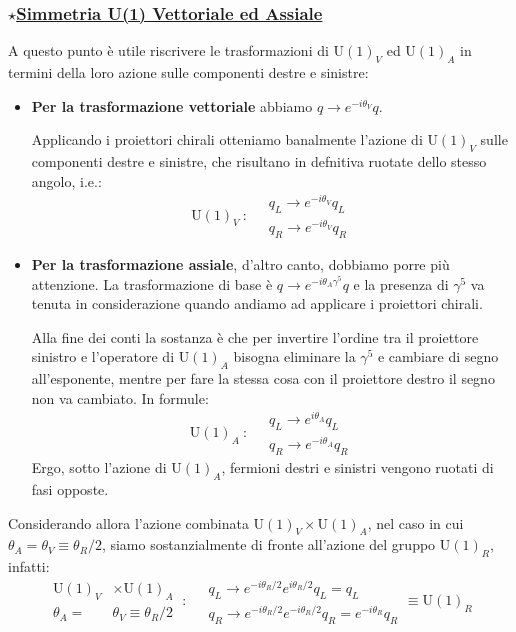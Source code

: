\documentclass[../main.tex]{subfiles}
\begin{document}
\subsubsection{$\star$\underline{Simmetria U(1) Vettoriale ed Assiale}}
A questo punto è utile riscrivere le trasformazioni di $\textrm{U}(1)_V$ ed $\textrm{U}(1)_A$ in termini della loro azione sulle componenti destre e sinistre:
\begin{itemize}
    \item \textbf{Per la trasformazione vettoriale} abbiamo $q\rightarrow e^{-i\theta_V}q$.

    Applicando i proiettori chirali otteniamo banalmente l'azione di $\textrm{U}(1)_V$ sulle componenti destre e sinistre, che risultano in defnitiva ruotate dello stesso angolo, i.e.:
    \[
    \boxed{
    \textrm{U}(1)_V ~:~
    \begin{aligned}
        &q_L\rightarrow e^{-i\theta_V}q_L\\
        &q_R\rightarrow e^{-i\theta_V}q_R
    \end{aligned}}
    \]
    
    \item \textbf{Per la trasformazione assiale}, d'altro canto, dobbiamo porre più attenzione. La trasformazione di base è $q\rightarrow e^{-i\theta_A\gamma^5}q$ e la presenza di $\gamma^5$ va tenuta in considerazione quando andiamo ad applicare i proiettori chirali.

    Alla fine dei conti la sostanza è che per invertire l'ordine tra il proiettore sinistro e l'operatore di $\textrm{U}(1)_A$ bisogna eliminare la $\gamma^5$ e cambiare di segno all'esponente, mentre per fare la stessa cosa con il proiettore destro il segno non va cambiato. In formule:
    \[
    \boxed{
    \textrm{U}(1)_A ~:~
    \begin{aligned}
        &q_L\rightarrow e^{i\theta_A}q_L\\
        &q_R\rightarrow e^{-i\theta_A}q_R
    \end{aligned}}
    \]
    Ergo, sotto l'azione di $\textrm{U}(1)_A$, fermioni destri e sinistri vengono ruotati di fasi opposte.
\end{itemize}
Considerando allora l'azione combinata $\textrm{U}(1)_V\times \textrm{U}(1)_A$, nel caso in cui $\theta_A=\theta_V \equiv \theta_R/2$, siamo sostanzialmente di fronte all'azione del gruppo $\textrm{U}(1)_R$, infatti:
\[
\boxed{
\begin{aligned}
    \textrm{U}(1)_V&\times \textrm{U}(1)_A \\
    \theta_A=&\theta_V \equiv {\theta_R}/2
\end{aligned}~:~
\begin{aligned}
    &q_L\rightarrow e^{-i\theta_R/2}e^{i\theta_R/2}q_L = q_L\\
    &q_R\rightarrow e^{-i\theta_R/2}e^{-i\theta_R/2}q_R = e^{-i\theta_R}q_R
\end{aligned}}\equiv \textrm{U}(1)_R
\]
\end{document}
